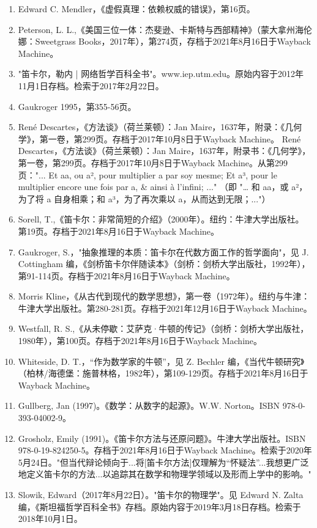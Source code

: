 \begin{enumerate}
\item Edward C. Mendler，《虚假真理：依赖权威的错误》，第16页。
\item Peterson, L. L.,《美国三位一体：杰斐逊、卡斯特与西部精神》（蒙大拿州海伦娜：Sweetgrass Books，2017年），第274页，存档于2021年8月16日于Wayback Machine。
\item "笛卡尔，勒内 | 网络哲学百科全书"。www.iep.utm.edu。原始内容于2012年11月1日存档。检索于2017年2月22日。
\item Gaukroger 1995，第355-56页。
\item René Descartes，《方法谈》（荷兰莱顿）：Jan Maire，1637年，附录：《几何学》，第一卷，第299页。存档于2017年10月8日于Wayback Machine。
René Descartes，《方法谈》（荷兰莱顿）：Jan Maire，1637年，附录书：《几何学》，第一卷，第299页。存档于2017年10月8日于Wayback Machine。从第299页："... Et aa, ou a², pour multiplier a par soy mesme; Et a³, pour le multiplier encore une fois par a, & ainsi à l'infini; ..." （即 "… 和 aa，或 a²，为了将 a 自身相乘；和 a³，为了再次乘以 a，从而达到无限；..."）
\item Sorell, T.,《笛卡尔：非常简短的介绍》（2000年）。纽约：牛津大学出版社。第19页。存档于2021年8月16日于Wayback Machine。
\item Gaukroger, S.，"抽象推理的本质：笛卡尔在代数方面工作的哲学面向"，见 J. Cottingham 编，《剑桥笛卡尔伴随读本》（剑桥：剑桥大学出版社，1992年），第91-114页。存档于2021年8月16日于Wayback Machine。
\item Morris Kline，《从古代到现代的数学思想》，第一卷（1972年）。纽约与牛津：牛津大学出版社。第280-281页。存档于2021年12月16日于Wayback Machine。
\item Westfall, R. S.,《从未停歇：艾萨克·牛顿的传记》（剑桥：剑桥大学出版社，1980年），第100页。存档于2021年8月16日于Wayback Machine。
\item Whiteside, D. T.，“作为数学家的牛顿”，见 Z. Bechler 编，《当代牛顿研究》（柏林/海德堡：施普林格，1982年），第109-129页。存档于2021年8月16日于Wayback Machine。
\item Gullberg, Jan (1997)。《数学：从数字的起源》。W.W. Norton。ISBN 978-0-393-04002-9。
\item Grosholz, Emily (1991)。《笛卡尔方法与还原问题》。牛津大学出版社。ISBN 978-0-19-824250-5。存档于2021年8月16日于Wayback Machine。检索于2020年5月24日。"但当代辩论倾向于...将[笛卡尔方法]仅理解为“怀疑法”...我想更广泛地定义笛卡尔的方法...以追踪其在数学和物理学领域以及形而上学中的影响。"
\item Slowik, Edward（2017年8月22日）。"笛卡尔的物理学"。见 Edward N. Zalta 编，《斯坦福哲学百科全书》存档。原始内容于2019年3月18日存档。检索于2018年10月1日。

\end{enumerate}
